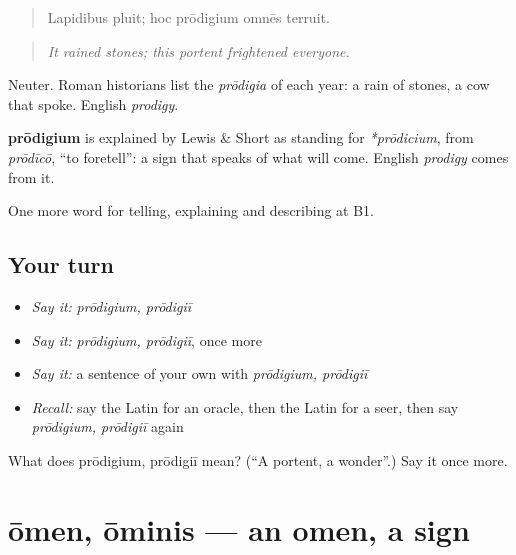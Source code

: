 \begin{quote}
Lapidibus pluit; hoc prōdigium omnēs terruit.
\end{quote}

\begin{quote}
\emph{It rained stones; this portent frightened everyone.}
\end{quote}

Neuter. Roman historians list the \emph{prōdigia} of each year: a rain of stones, a cow that spoke. English \emph{prodigy}.

\begin{cousinweb}
\textbf{prōdigium} is explained by Lewis \& Short as standing for \emph{*prōdicium}, from \emph{prōdīcō}, \textquotedblleft{}to foretell\textquotedblright{}: a sign that speaks of what will come. English \emph{prodigy} comes from it.
\end{cousinweb}

\begin{grammarlens}[title={What you've built}]
One more word for telling, explaining and describing at B1.
\end{grammarlens}

\subsection*{Your turn}
\begin{itemize}
\raggedright
  \item \emph{Say it:} \emph{prōdigium, prōdigiī}
  \item \emph{Say it:} \emph{prōdigium, prōdigiī}, once more
  \item \emph{Say it:} a sentence of your own with \emph{prōdigium, prōdigiī}
  \item \emph{Recall:} say the Latin for an oracle, then the Latin for a seer, then say \emph{prōdigium, prōdigiī} again
\end{itemize}

\begin{tcolorbox}[breakable,colback=teal!4,colframe=teal!35!black,title={Before you move on}]
What does prōdigium, prōdigiī mean? (\textquotedblleft{}A portent, a wonder\textquotedblright{}.) Say it once more.
\end{tcolorbox}
\section[ōmen, ōminis]{ōmen, ōminis — an omen, a sign}

\label{lesson:LA-C348-omen}



